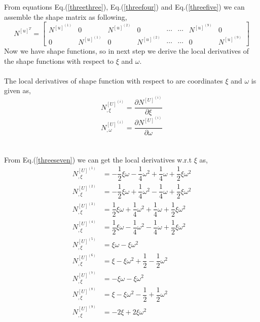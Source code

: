 \documentclass[12pt]{article}
\begin{document}
\\
\\
From equations Eq.(\ref{threethree}), Eq.(\ref{threefour}) and Eq.(\ref{threefive}) we can assemble the shape matrix as following,
\begin{equation}\label{threesix}
N^{[u]^{T}}=
\begin{bmatrix}
N^{[u]^{(1)}}&0&N^{[u]^{(2)}}&0&\cdots &\cdots& N^{[u]^{(9)}}&0 \\
0&N^{[u]^{(1)}}&0&N^{[u]^{(2)}}&\cdots &\cdots& 0&N^{[u]^{(9)}}
\end{bmatrix}
\end{equation}
\newpage
Now we have shape functions, so in next step we derive the local derivatives of the shape functions with respect to $\xi$ and $\omega$. 
\\
\\
The local derivatives of shape function with respect to are coordinates $\xi$ and $\omega$ is given as, 
\begin{equation}\label{threeseven}
N^{[U]^{(i)}}_{,\xi} = \dfrac{\partial N^{[U]^{(i)}} }{\partial \xi}
\end{equation}
\begin{equation}\label{threeeight}
N^{[U]^{(i)}}_{,\omega} = \dfrac{\partial N^{[U]^{(i)}} }{\partial \omega}
\end{equation}
\\
\\
From Eq.(\ref{threeseven}) we can get the local derivatives w.r.t  $\xi$ as,
\begin{equation}\label{threenine}
\begin{aligned}
N_{,\xi}^{[U]^{(1)}} &= -\dfrac{1}{2}\xi\omega-\dfrac{1}{4}\omega^2+\dfrac{1}{4}\omega+\dfrac{1}{2}\xi\omega^2  \\
N_{,\xi}^{[U]^{(2)}} &= -\dfrac{1}{2}\xi\omega+\dfrac{1}{4}\omega^2-\dfrac{1}{4}\omega+\dfrac{1}{2}\xi\omega^2  \\
N_{,\xi}^{[U]^{(3)}} &= \dfrac{1}{2}\xi\omega+\dfrac{1}{4}\omega^2+\dfrac{1}{4}\omega+\dfrac{1}{2}\xi\omega^2 \\
N_{,\xi}^{[U]^{(4)}} &= \dfrac{1}{2}\xi\omega-\dfrac{1}{4}\omega^2-\dfrac{1}{4}\omega+\dfrac{1}{2}\xi\omega^2 \\
N_{,\xi}^{[U]^{(5)}} &= \xi\omega-\xi\omega^2 \\
N_{,\xi}^{[U]^{(6)}} &= \xi-\xi\omega^2+\dfrac{1}{2}-\dfrac{1}{2}\omega^2 \\
N_{,\xi}^{[U]^{(7)}} &= -\xi\omega-\xi\omega^2 \\
N_{,\xi}^{[U]^{(8)}} &= \xi-\xi\omega^2-\dfrac{1}{2}+\dfrac{1}{2}\omega^2 \\
N_{,\xi}^{[U]^{(9)}} &= -2\xi+2\xi\omega^2 \\
\end{aligned}
\end{equation}
\end{document}
